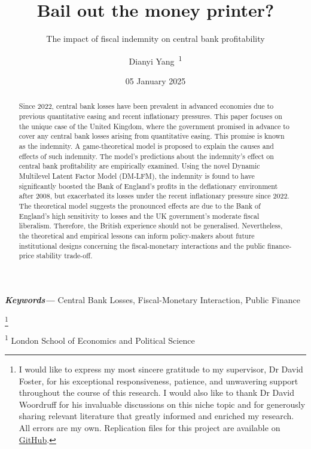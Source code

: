 \documentclass[
  a4paper,
  abstract=true]{scrartcl}
\title{Bail out the money printer?}
\subtitle{The impact of fiscal indemnity on central bank profitability}
\author{Dianyi Yang~\orcidlink{0009-0004-4652-3429}\textsuperscript{1}}
\date{05 January 2025}
\providecommand{\keywords}[1]
{
  \small	
  \textbf
{\textit{Keywords---}} #1
}
\newcommand\blfootnote[1]{%
  \begingroup

  \renewcommand\thefootnote{}\footnote{#1}%
  \addtocounter{footnote}{-1}%
  \endgroup }
\theoremstyle{definition}
\begin{document}
\maketitle
\begin{abstract}
Since 2022, central bank losses have been prevalent in advanced
economies due to previous quantitative easing and recent inflationary
pressures. This paper focuses on the unique case of the United Kingdom,
where the government promised in advance to cover any central bank
losses arising from quantitative easing. This promise is known as the
indemnity. A game-theoretical model is proposed to explain the causes
and effects of such indemnity. The model's predictions about the
indemnity's effect on central bank profitability are empirically
examined. Using the novel Dynamic Multilevel Latent Factor Model
(DM-LFM), the indemnity is found to have significantly boosted the Bank
of England's profits in the deflationary environment after 2008, but
exacerbated its losses under the recent inflationary pressure since
2022. The theoretical model suggests the pronounced effects are due to
the Bank of England's high sensitivity to losses and the UK government's
moderate fiscal liberalism. Therefore, the British experience should not
be generalised. Nevertheless, the theoretical and empirical lessons can
inform policy-makers about future institutional designs concerning the
fiscal-monetary interactions and the public finance-price stability
trade-off.
\end{abstract}
\begin{center}
\keywords{Central Bank Losses, Fiscal-Monetary Interaction, Public
Finance}
\end{center}

\blfootnote{I would like to express my most sincere gratitude to my
supervisor, Dr David Foster, for his exceptional responsiveness,
patience, and unwavering support throughout the course of this research.
I would also like to thank Dr David Woordruff for his invaluable
discussions on this niche topic and for generously sharing relevant
literature that greatly informed and enriched my research. All errors
are my own. Replication files for this project are available on
\href{https://github.com/kv9898/BailoutCB}{GitHub}.}




\textsuperscript{1} London School of Economics and Political Science

\newpage
\end{document}
